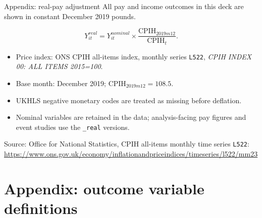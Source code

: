 \documentclass[aspectratio=169,11pt]{beamer}
\begin{document}
\begin{frame}{Appendix: real-pay adjustment}
\small
All pay and income outcomes in this deck are shown in constant December 2019 pounds.

\vspace{0.6em}
\[
Y^{real}_{it}
=
Y^{nominal}_{it}
\times
\frac{\text{CPIH}_{2019m12}}{\text{CPIH}_{t}}.
\]

\vspace{0.4em}
\begin{itemize}
  \item Price index: ONS CPIH all-items index, monthly series \texttt{L522}, \emph{CPIH INDEX 00: ALL ITEMS 2015=100}.
  \item Base month: December 2019; \(\text{CPIH}_{2019m12}=108.5\).
  \item UKHLS negative monetary codes are treated as missing before deflation.
  \item Nominal variables are retained in the data; analysis-facing pay figures and event studies use the \texttt{\_real} versions.
\end{itemize}

\vspace{0.4em}
\scriptsize
Source: Office for National Statistics, CPIH all-items monthly time series \texttt{L522}: \url{https://www.ons.gov.uk/economy/inflationandpriceindices/timeseries/l522/mm23}
\end{frame}

\section{Appendix: outcome variable definitions}
\end{document}
